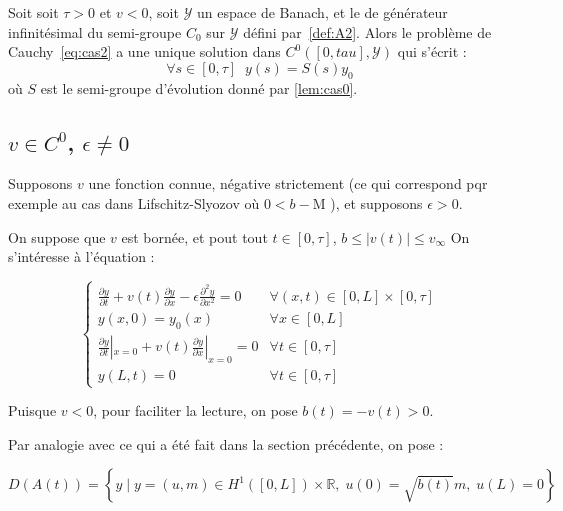 \documentclass[a4paper]{article}
\newcommand{\dep}{b}
\newcommand{\mass}{\mathrm{M}}
\begin{document}
\begin{theoreme}
	Soit soit $\tau>0$ et $v<0$,
	soit $\mathscr{Y}$ un espace de Banach, et le  
	de générateur infinitésimal du semi-groupe $C_0$ sur $\mathscr{Y}$
	défini par~\eqref{def:A2}.
	Alors le problème de Cauchy~\eqref{eq:cas2} a une unique solution dans $C^0([0,tau],\mathscr{Y})$ qui s'écrit :
	\[ \forall s\in[0,\tau] \; \; y(s) = S(s)y_0 \]
	où $S$ est le semi-groupe d'évolution donné par \ref{lem:cas0}.
\end{theoreme}




\vspace{1.0cm}
\subsection{$v \in C^0$, $\epsilon \ne 0$}

Supposons $v$ une fonction connue, négative strictement 
(ce qui correspond pqr exemple au cas dans Lifschitz-Slyozov où $0<\dep -\mass $ ), 
et supposons $\epsilon>0$. 

On suppose que $v$ est bornée, et pout tout $t \in[0,\tau]$, 
$ \dep \leq |v(t)| \leq v_{\infty} $
On s'intéresse à l'équation :


\begin{equation}
\label{eq:cas3}
\begin{cases}
 \displaystyle \frac{\partial y}{\partial t}
 + v(t) \frac{\partial y} {\partial x}  
 - \epsilon \frac{\partial^2 y} {\partial x^2}
 = 0  & \forall (x,t) \in [0,L] \times [0, \tau]\\
 y(x,0) = y_{0} (x) & \forall x \in [0,L] \\
 \displaystyle \frac{\partial y}{\partial t}|_{x=0}
 + v(t) \frac{\partial y} {\partial x}|_{x=0} = 0 & \forall t \in [0,\tau]\\
 y(L,t)=0 & \forall t \in [0,\tau]
\end{cases}
\end{equation}

Puisque $v<0$, pour faciliter la lecture, on pose $\dep (t) = - v(t) >0$.

Par analogie avec ce qui a été fait dans la section précédente, on pose : 

\[D(A(t)) = \left\{ y \; | \; y = (u,m) \in H^1([0,L])\times \mathbb{R},
 \; u(0)=\sqrt{\dep (t)} m, \; u(L)=0 \right\} \]
 
\end{document}
